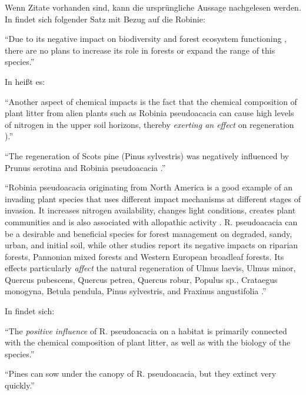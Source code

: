 \documentclass[twocolumn]{scrartcl}
\begin{document}
Wenn Zitate vorhanden sind, kann die ursprüngliche Aussage nachgelesen
werden. In \citet{szyp2023robinieGenetik} findet sich folgender Satz
mit Bezug auf die Robinie:

\enquote{Due to its negative impact on biodiversity and forest
  ecosystem functioning \citep{langmaier2020alienPlants}, there are no
  plans to increase its role in forests or expand the range of this
  species.}

In \citep{langmaier2020alienPlants} heißt es:

\enquote{Another aspect of chemical impacts is the fact that the
  chemical composition of plant litter from alien plants such as
  Robinia pseudoacacia can cause high levels of nitrogen in the upper
  soil horizons, thereby \emph{exerting an effect} on regeneration
  \citep{rahmonov2009robinieLitter}).}

\enquote{The regeneration of Scots pine (Pinus sylvestris) was
  negatively influenced by Prunus serotina and Robinia pseudoacacia
  \citep{sebert2007invasive,rahmonov2009robinieLitter}.}

\enquote{Robinia pseudoacacia originating from North America is a good
  example of an invading plant species that uses different impact
  mechanisms at different stages of invasion. It increases nitrogen
  availability, changes light conditions, creates plant communities
  and is also associated with allopathic activity
  \citep{rahmonov2009robinieLitter,campagnaro2018alien}.
  R. pseudoacacia can be a desirable and beneficial species for forest
  management on degraded, sandy, urban, and initial soil, while other
  studies report its negative impacts on riparian forests, Pannonian
  mixed forests and Western European broadleaf forests. Its effects
  particularly \emph{affect} the natural regeneration of Ulmus laevis,
  Ulmus minor, Quercus pubescens, Quercus petrea, Quercus robur,
  Populus sp., Crataegus monogyna, Betula pendula, Pinus sylvestris,
  and Fraxinus angustifolia
  \citep{rahmonov2009robinieLitter,maringer2012robinePostFire,petrasova2013neophyten,radtke2013robinieNiederwald,terwei2013nonNative}.}

In \citet{rahmonov2009robinieLitter} findet sich:

\enquote{The \emph{positive influence} of R. pseudoacacia on a habitat
  is primarily connected with the chemical composition of plant
  litter, as well as with the biology of the species.}

\enquote{Pines can sow under the canopy of R. pseudoacacia, but they
  extinct very quickly.}
\end{document}
